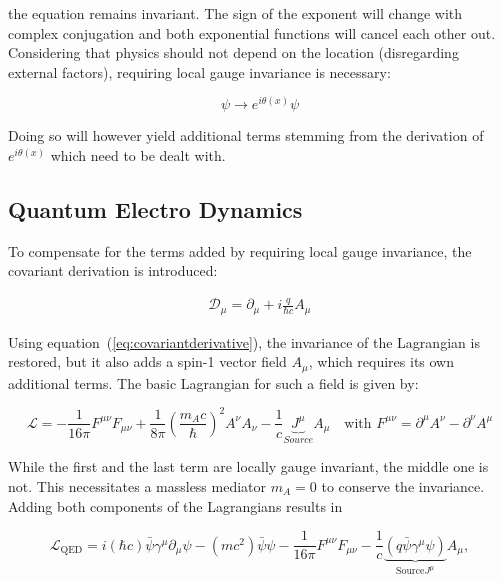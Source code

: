 \noindent the equation remains invariant. The sign of the exponent will change with complex conjugation and both exponential functions will cancel each other out. Considering that physics should not depend on the location (disregarding external factors), requiring local gauge invariance is necessary:

\begin{equation}
  \label{eq:localgaugeinv}
  \psi \rightarrow e^{i \theta(x)} \psi
\end{equation}

\noindent Doing so will however yield additional terms stemming from the derivation of $e^{i \theta(x)}$ which need to be dealt with. 

\subsection{Quantum Electro Dynamics}
\label{sec:qed}

To compensate for the terms added by requiring local gauge invariance, the covariant derivation is introduced:

\begin{align}
  \label{eq:covariantderivative}
  \mathcal{D}_\mu = \partial_\mu + i \frac{q}{\hbar c} A_\mu
\end{align}

\noindent Using equation~(\ref{eq:covariantderivative}), the invariance of the Lagrangian is restored, but it also adds a spin-1 vector field $A_\mu$, which requires its own additional terms. The basic Lagrangian for such a field is given by:

\begin{equation}
  \label{eq:procalagrangian}
  \mathcal{L} = - \frac{1}{16 \pi} F^{\mu \nu} F_{\mu \nu} + \frac{1}{8 \pi} \left( \frac{m_A c}{\hbar} \right)^2 A^\nu A_\nu - \frac{1}{c} \underbrace{J^\mu}_{Source} A_\mu \quad \text{with } F^{\mu \nu} = \partial^\mu A^\nu - \partial^\nu A^\mu
\end{equation}

\noindent While the first and the last term are locally gauge invariant, the middle one is not. This necessitates a massless mediator $m_A = 0$ to conserve the invariance. Adding both components of the Lagrangians results in

\begin{equation}
  \label{eq:qedlagrangian}
  \mathcal{L}_{\text{QED}} = i (\hbar c) \bar{\psi} \gamma^\mu \partial_\mu \psi - (m c^2) \bar{\psi} \psi - \frac{1}{16 \pi} F^{\mu \nu} F_{\mu \nu} - \frac{1}{c} \underbrace{(q \bar{\psi} \gamma^\mu  \psi)}_{\text{Source} J^\mu} A_\mu,
\end{equation}

